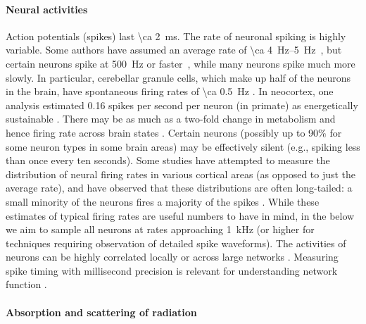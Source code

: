 \paragraph{Neural activities}
Action potentials (spikes) last \SI{\ca 2}{\milli\second}.
The rate of neuronal spiking is highly variable. Some authors have assumed an average rate of \SIrange{\ca 4}{5}{\hertz}~\cite{sarpeshkar10, harris2012synaptic}, but certain neurons spike at \SI{500}{\hertz} or faster~\cite{gittis10}, while many neurons spike much more slowly. In particular, cerebellar granule cells, which make up half of the neurons in the brain, have spontaneous firing rates of \SI{\ca 0.5}{\hertz} \cite{chadderton2004integration}. In neocortex, one analysis estimated 0.16 spikes per second per neuron (in primate) as energetically sustainable \cite{lennie2003cost}. There may be as much as a two-fold change in metabolism and hence firing rate across brain states \cite{howarth2012updated}. Certain neurons (possibly up to 90$\%$ for some neuron types in some brain areas) may be effectively silent \cite{Shoham2006, Barth2012345} (e.g., spiking less than once every ten seconds). Some studies have attempted to measure the distribution of neural firing rates in various cortical areas (as opposed to just the average rate), and have observed that these distributions are often long-tailed: a small minority of the neurons fires a majority of the spikes \cite{roxin2011distribution, oconnor2010neural, hromadka2008sparse, shafi2007variability}. While these estimates of  typical firing rates are useful numbers to have in mind, in the below we aim to sample all neurons at rates approaching \SI{1}{\kilo\hertz} (or higher for techniques requiring observation of detailed spike waveforms). The activities of neurons can be highly correlated locally or across large networks \cite{schneidman2006weak}. Measuring spike timing with millisecond precision is relevant for understanding network function \cite{markram2011history, Babadi2013, Taillefumier27032013, Gire2013416}. 

\paragraph{Absorption and scattering of radiation}

